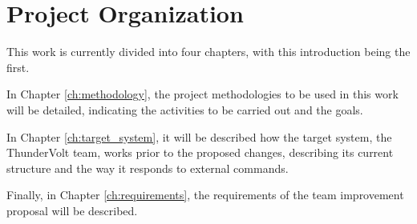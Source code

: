 \section{Project Organization}

This work is currently divided into four chapters, with this introduction being the first.

In Chapter \ref{ch:methodology}, the project methodologies to be used in this work will be detailed, indicating the activities to be carried out and the goals.

In Chapter \ref{ch:target_system}, it will be described how the target system, the ThunderVolt team, works prior to the proposed changes, describing its current structure and the way it responds to external commands.

Finally, in Chapter \ref{ch:requirements}, the requirements of the team improvement proposal will be described.
